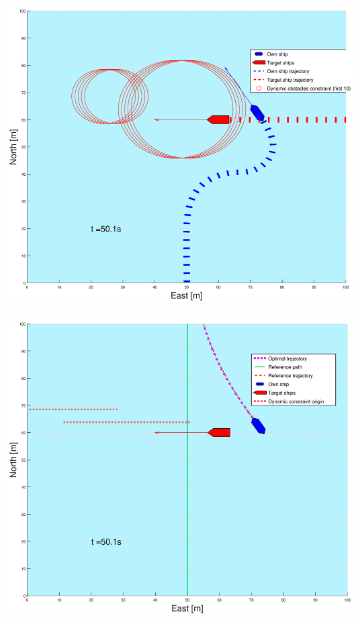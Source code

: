 \begin{figure}[ht]\ContinuedFloat
    \begin{subfigure}[b]{0.49\textwidth}
        \centering
        \includegraphics[width=\textwidth]{Images/Figures/enkel_GW/_Simple_0fig1_time=50}
    \end{subfigure}
    \hfill
    \begin{subfigure}[b]{0.499\textwidth}
        \centering
        \includegraphics[width=\textwidth]{Images/Figures/enkel_GW/_Simple_0fig999_time=50}

\end{subfigure}
\end{figure}
